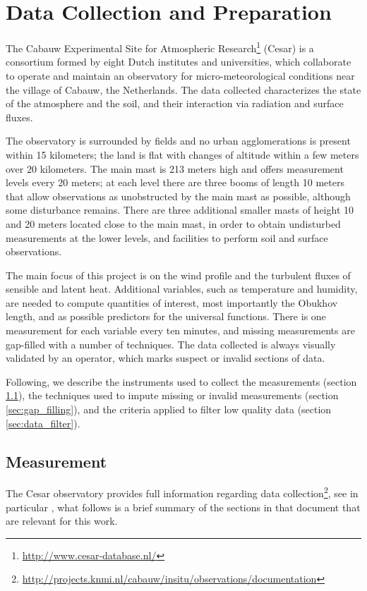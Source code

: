\documentclass[a4paper]{book}
\begin{document}
\section{Data Collection and Preparation}
\label{sec:data_collection}
The Cabauw Experimental Site for Atmospheric Research\footnote{\url{http://www.cesar-database.nl/}} (Cesar) is a consortium formed by eight Dutch institutes and universities, which collaborate to operate and maintain an observatory for micro-meteorological conditions near the village of Cabauw, the Netherlands. The data collected characterizes the state of the atmosphere and the soil, and their interaction via radiation and surface fluxes.

The observatory is surrounded by fields and no urban agglomerations is present within 15 kilometers; the land is flat with changes of altitude within a few meters over 20 kilometers. The main mast is 213 meters high and offers measurement levels every 20 meters; at each level there are three booms of length 10 meters that allow observations as unobstructed by the main mast as possible, although some disturbance remains. There are three additional smaller masts of height 10 and 20 meters located close to the main mast, in order to obtain undisturbed measurements at the lower levels, and facilities to perform soil and surface observations.

The main focus of this project is on the wind profile and the turbulent fluxes of sensible and latent heat. Additional variables, such as temperature and humidity, are needed to compute quantities of interest, most importantly the Obukhov length, and as possible predictors for the universal functions. There is one measurement for each variable every ten minutes, and missing measurements are gap-filled with a number of techniques. The data collected is always visually validated by an operator, which marks suspect or invalid sections of data.

Following, we describe the instruments used to collect the measurements (section \ref{sec:measurement}), the techniques used to impute missing or invalid measurements (section \ref{sec:gap_filling}), and the criteria applied to filter low quality data (section \ref{sec:data_filter}).

\subsection{Measurement}
\label{sec:measurement}
The Cesar observatory provides full information regarding data collection\footnote{\url{http://projects.knmi.nl/cabauw/insitu/observations/documentation}}, see in particular \cite{cabauwinsitu}, what follows is a brief summary of the sections in that document that are relevant for this work.
\end{document}
